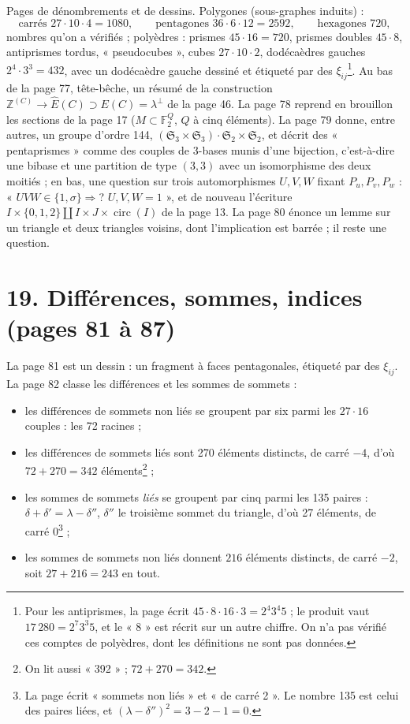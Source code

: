 \documentclass[11pt,a4paper]{article}
\begin{document}
Pages de dénombrements et de dessins. Polygones (sous-graphes induits) :
\[
\text{carrés } 27 \cdot 10 \cdot 4 = 1080, \qquad \text{pentagones } 36 \cdot 6
\cdot 12 = 2592, \qquad \text{hexagones } 720 ,
\]
nombres qu'on a vérifiés ; polyèdres : prismes $45 \cdot 16 = 720$, prismes
doubles $45 \cdot 8$, antiprismes tordus, « pseudocubes », cubes $27 \cdot 10
\cdot 2$, dodécaèdres gauches $2^4 \cdot 3^3 = 432$, avec un dodécaèdre gauche
dessiné et étiqueté par des $\xi_{ij}$\footnote{Pour les antiprismes, la page
écrit $45 \cdot 8 \cdot 16 \cdot 3 = 2^4 3^4 5$ ; le produit vaut $17\,280 =
2^7 3^3 5$, et le « 8 » est récrit sur un autre chiffre. On n'a pas vérifié
ces comptes de polyèdres, dont les définitions ne sont pas données.}. Au bas
de la page 77, tête-bêche, un résumé de la construction $\mathbb{Z}^{(C)} \to
\widehat E(C) \supset E(C) = \lambda^\perp$ de la page 46. La page 78 reprend
en brouillon les sections de la page 17 ($M \subset \mathbb{F}_2^Q$, $Q$ à
cinq éléments). La page 79 donne, entre autres, un groupe d'ordre 144, $(
\mathfrak{S}_3 \times \mathfrak{S}_3) \cdot \mathfrak{S}_2 \times
\mathfrak{S}_2$, et décrit des « pentaprismes » comme des couples de 3-bases
munis d'une bijection, c'est-à-dire une bibase et une partition de type $(3,
3)$ avec un isomorphisme des deux moitiés ; en bas, une question sur trois
automorphismes $U, V, W$ fixant $P_u, P_v, P_w$ : « $UVW \in \lbrace 1,
\sigma\rbrace \Rightarrow$? $U, V, W = 1$ », et de nouveau l'écriture $I \times
\lbrace 0, 1, 2\rbrace \amalg I \times J \times \operatorname{circ}(I)$ de la
page 13. La page 80 énonce un lemme sur un triangle et deux triangles voisins,
dont l'implication est barrée ; il reste une question.

\section*{19. Différences, sommes, indices (pages 81 à 87)}

La page 81 est un dessin : un fragment à faces pentagonales, étiqueté par des
$\xi_{ij}$. La page 82 classe les différences et les sommes de sommets :

\begin{itemize}
\item[(0)] les différences de sommets non liés se groupent par six parmi les
  $27 \cdot 16$ couples : les 72 racines ;
\item[(6)] les différences de sommets liés sont 270 éléments distincts, de
  carré $-4$, d'où $72 + 270 = 342$ éléments\footnote{On lit aussi « 392 » ;
  $72 + 270 = 342$.} ;
\item[(1)] les sommes de sommets \emph{liés} se groupent par cinq parmi les
  135 paires : $\delta + \delta' = \lambda - \delta''$, $\delta''$ le troisième
  sommet du triangle, d'où 27 éléments, de carré $0$\footnote{La page écrit
  « sommets non liés » et « de carré 2 ». Le nombre 135 est celui des paires
  liées, et $(\lambda - \delta'')^2 = 3 - 2 - 1 = 0$.} ;
\item[(b)] les sommes de sommets non liés donnent $216$ éléments distincts,
  de carré $-2$, soit $27 + 216 = 243$ en tout.
\end{itemize}
\end{document}
